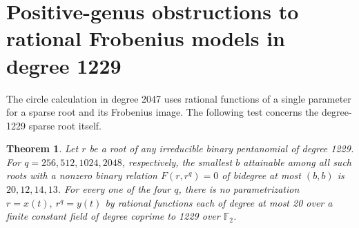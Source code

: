 \documentclass[11pt]{article}
\newtheorem{theorem}{Theorem}
\newcommand{\F}{\mathbb F_2}
\begin{document}
\section{Positive-genus obstructions to rational Frobenius models in degree 1229}
\label{sec:1229-frobenius-curves}
The circle calculation in degree 2047 uses rational functions of a
single parameter for a sparse root and its Frobenius image. The
following test concerns the degree-1229 sparse root itself.

\begin{theorem}\label{thm:1229-frobenius-curves}
Let \(r\) be a root of any irreducible binary pentanomial of degree
1229. For \(q=256,512,1024,2048\), respectively, the smallest
\(b\) attainable among all such roots with a nonzero binary relation
\(F(r,r^q)=0\) of bidegree at most \((b,b)\) is
\(20,12,14,13\). For every one of the four \(q\), there is no
parametrization \(r=x(t),\ r^q=y(t)\) by rational functions each
of degree at most 20 over a finite constant field of degree coprime
to 1229 over \(\F\).
\end{theorem}
\end{document}
